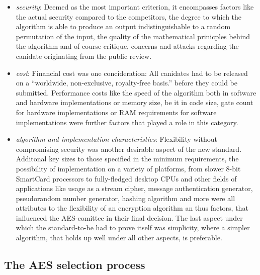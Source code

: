 \begin{itemize}
\item
  \emph{security}: Deemed as the most important criterion, it
  encompasses factors like the actual security compared to the
  competitors, the degree to which the algorithm is able to produce an
  output indistinguishable to a random permutation of the input, the
  quality of the mathematical prinicples behind the algorithm and of
  course critique, concerns and attacks regarding the canidate
  originating from the public review.
\item
  \emph{cost}: Financial cost was one concideration: All canidates had
  to be released on a ``worldwide, non-exclusive, royalty-free basis.''
  before they could be submitted. Performance costs like the speed of
  the algorithm both in software and hardware implementations or memory
  size, be it in code size, gate count for hardware implementations or
  RAM requirements for software implementations were further factors
  that played a role in this category.
\item
  \emph{algorithm and implementation characteristics}: Flexibility
  without compromising security was another desirable aspect of the new
  standard. Additonal key sizes to those specified in the minimum
  requirements, the possibility of implementation on a variety of
  platforms, from slower 8-bit SmartCard processors to fully-fledged
  desktop CPUs and other fields of applications like usage as a stream
  cipher, message authentication generator, pseudorandom number
  generator, hashing algorithm and more were all attributes to the
  flexibility of an encryption algorithm an thus factors, that
  influenced the AES-comittee in their final decision. The last aspect
  under which the standard-to-be had to prove itself was simplicity,
  where a simpler algorithm, that holds up well under all other aspects,
  is preferable.
\end{itemize}


\subsection{The AES selection process}
\label{ch:aes}


